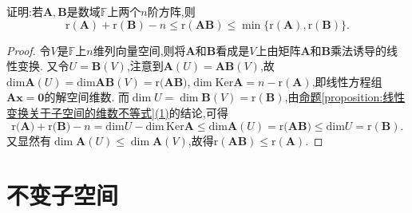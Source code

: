 \documentclass[lang=cn,newtx,10pt,scheme=chinese]{elegantbook}
\begin{document}
\begin{example}\label{example:4.243456}
证明:若\(\boldsymbol{A},\boldsymbol{B}\)是数域\(\mathbb{F}\)上两个\(n\)阶方阵,则
\[
\text{r}(\boldsymbol{A})+\text{r}(\boldsymbol{B})-n\leq\text{r}(\boldsymbol{A}\boldsymbol{B})\leq\min\{\text{r}(\boldsymbol{A}),\text{r}(\boldsymbol{B})\}.
\]
\end{example}
\begin{proof}
    令\(V\)是\(\mathbb{F}\)上\(n\)维列向量空间,则将\(\boldsymbol{A}\)和\(\boldsymbol{B}\)看成是\(V\)上由矩阵\(\boldsymbol{A}\)和\(\boldsymbol{B}\)乘法诱导的线性变换. 又令\(U = \boldsymbol{B}(V)\),注意到\(\boldsymbol{A}(U)=\boldsymbol{A}\boldsymbol{B}(V)\),故\(\mathrm{dim}\boldsymbol{A}(U)=\mathrm{dim}\boldsymbol{AB}(V)=\mathrm{r(}\boldsymbol{AB})\),\(\dim\text{Ker}\boldsymbol{A}=n - \text{r}(\boldsymbol{A})\),即线性方程组\(\boldsymbol{A}\boldsymbol{x}=\boldsymbol{0}\)的解空间维数. 而\(\dim U=\dim\boldsymbol{B}(V)=\text{r}(\boldsymbol{B})\),由\hyperref[proposition:线性变换关于子空间的维数不等式]{命题\ref{proposition:线性变换关于子空间的维数不等式}(1)}的结论,可得
\[
\mathrm{r(}\boldsymbol{A})+\mathrm{r(}\boldsymbol{B})-n=\mathrm{dim}U-\mathrm{dim}\,\mathrm{Ker}\boldsymbol{A}\leqslant \mathrm{dim}\boldsymbol{A}\left( U \right) =\mathrm{r(}\boldsymbol{AB})\leqslant \mathrm{dim}U=\mathrm{r}\left( \boldsymbol{B} \right).
\]
又显然有\(\dim\boldsymbol{A}(U)\leq\dim\boldsymbol{A}(V)\),故得\(\text{r}(\boldsymbol{A}\boldsymbol{B})\leq\text{r}(\boldsymbol{A})\).
\end{proof}



\section{不变子空间}
\end{document}
